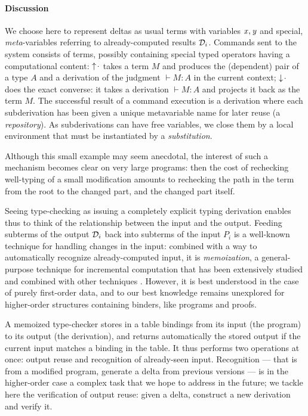 \documentclass{llncs}
\begin{document}
\paragraph{Discussion}

We choose here to represent deltas as usual terms with variables $\text{\textit{x}}, \text{\textit{y}}$ and special, \emph{meta}-variables referring to
already-computed results $\mathcal D_i$. Commands sent to the system consists
of terms, possibly containing special typed operators having a
computational content: $\uparrow\!{\cdot}$ takes a term $M$ and produces
the (dependent) pair of a type $A$ and a derivation of the judgment
$\vdash M:A$ in the current context; $\downarrow\!{\cdot}$ does the exact
converse: it takes a derivation $\vdash M:A$ and projects it back as
the term $M$. The successful result of a command execution is a
derivation where each subderivation has been given a unique
metavariable name for later reuse (a \emph{repository}). As
subderivations can have free variables, we close them by a local
environment that must be instantiated by a \emph{substitution}.

Although this small example may seem anecdotal, the interest of such a
mechanism becomes clear on very large programs: then the cost of
rechecking well-typing of a small modification amounts to rechecking
the path in the term from the root to the changed part, and the
changed part itself.


Seeing type-checking as issuing a completely explicit typing
derivation enables thus to think of the relationship between the input
and the output. Feeding subterms of the output $\mathcal D_i$ back into
subterms of the input $P_i$ is a well-known technique for handling
changes in the input: combined with a way to automatically recognize
already-computed input, it is \emph{memoization}, a general-purpose
technique for incremental computation that has been extensively
studied and combined with other techniques
\cite{pugh1989incremental,acar2003selective}. However, it is best
understood in the case of purely first-order data, and to our best
knowledge remains unexplored for higher-order structures containing
binders, like programs and proofs.

A memoized type-checker stores in a table bindings from its input (the
program) to its output (the derivation), and returns automatically the
stored output if the current input matches a binding in the table. It
thus performs two operations at once: output reuse and recognition of
already-seen input. Recognition --- that is from a modified program,
generate a delta from previous versions --- is in the higher-order
case a complex task that we hope to address in the future; we tackle
here the verification of output reuse: given a delta, construct a new
derivation and verify it.
\end{document}
